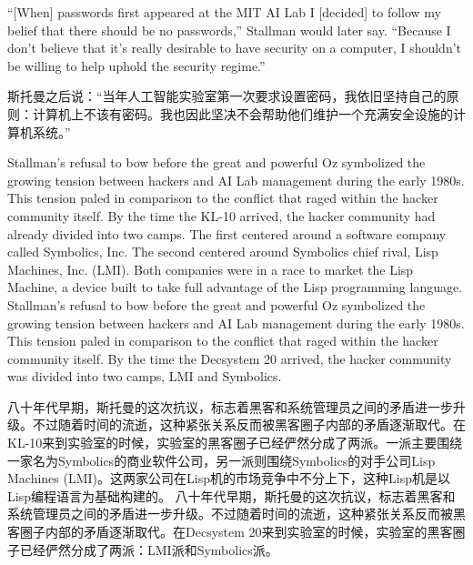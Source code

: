 \ifdefined\eng
``[When] passwords first appeared at the MIT AI Lab I [decided] to follow my belief that there should be no passwords,'' Stallman would later say. ``Because I don't believe that it's really desirable to have security on a computer, I shouldn't be willing to help uphold the security regime.''
\fi

\ifdefined\chs
斯托曼之后说：``当年人工智能实验室第一次要求设置密码，我依旧坚持自己的原则：计算机上不该有密码。我也因此坚决不会帮助他们维护一个充满安全设施的计算机系统。''
\fi

\ifdefined\eng
\ifdefined\vone
Stallman's refusal to bow before the great and powerful Oz symbolized the growing tension between hackers and AI Lab management during the early 1980s. This tension paled in comparison to the conflict that raged within the hacker community itself. By the time the KL-10 arrived, the hacker community had already divided into two camps. The first centered around a software company called Symbolics, Inc. The second centered around Symbolics chief rival, Lisp Machines, Inc. (LMI). Both companies were in a race to market the Lisp Machine, a device built to take full advantage of the Lisp programming language.
\fi
\ifdefined\vtwo
Stallman's refusal to bow before the great and powerful Oz symbolized the growing tension between hackers and AI Lab management during the early 1980s. This tension paled in comparison to the conflict that raged within the hacker community itself. By the time the Decsystem 20 arrived, the hacker community was divided into two camps, LMI and Symbolics.
\fi
\fi

\ifdefined\chs
\ifdefined\vone
八十年代早期，斯托曼的这次抗议，标志着黑客和系统管理员之间的矛盾进一步升级。不过随着时间的流逝，这种紧张关系反而被黑客圈子内部的矛盾逐渐取代。在KL-10来到实验室的时候，实验室的黑客圈子已经俨然分成了两派。一派主要围绕一家名为Symbolics的商业软件公司，另一派则围绕Symbolics的对手公司Lisp Machines (LMI)。这两家公司在Lisp机的市场竞争中不分上下，这种Lisp机是以Lisp编程语言为基础构建的。
\fi
\ifdefined\vtwo
八十年代早期，斯托曼的这次抗议，标志着黑客和系统管理员之间的矛盾进一步升级。不过随着时间的流逝，这种紧张关系反而被黑客圈子内部的矛盾逐渐取代。在Decsystem 20来到实验室的时候，实验室的黑客圈子已经俨然分成了两派：LMI派和Symbolics派。
\fi
\fi

